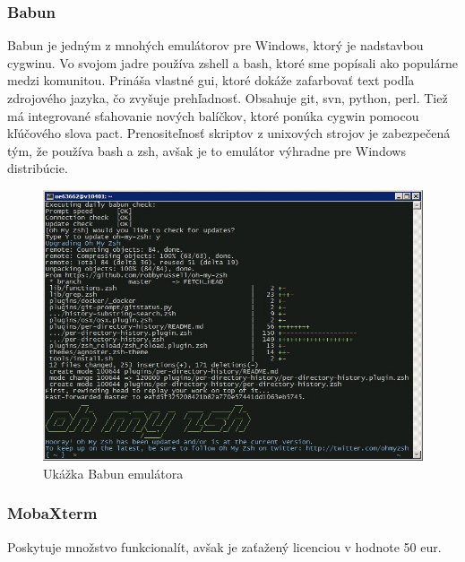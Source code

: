 \subsubsection{Babun}
\indent Babun je jedným z mnohých emulátorov pre Windows, ktorý je nadstavbou cygwinu. Vo svojom jadre používa zshell a bash, ktoré sme popísali ako populárne medzi komunitou. Prináša vlastné \acrshort{gui}, ktoré dokáže zafarbovať text podľa zdrojového jazyka, čo zvyšuje prehľadnosť. Obsahuje git, svn, python, perl. Tiež má integrované sťahovanie nových balíčkov, ktoré ponúka cygwin pomocou kľúčového slova pact. Prenositeľnosť skriptov z unixových strojov je zabezpečená tým, že používa bash a zsh, avšak je to emulátor výhradne pre Windows distribúcie.\cite{babun}
\begin{figure}[H]
	\centering
	\includegraphics[scale=0.4]{img/babun.jpeg}
	\caption{Ukážka Babun emulátora}
	\label{fig:test}
\end{figure}
\subsubsection{MobaXterm}
\indent Poskytuje množstvo funkcionalít, avšak je zaťažený licenciou v hodnote 50 eur. \cite{mobaxterm}
